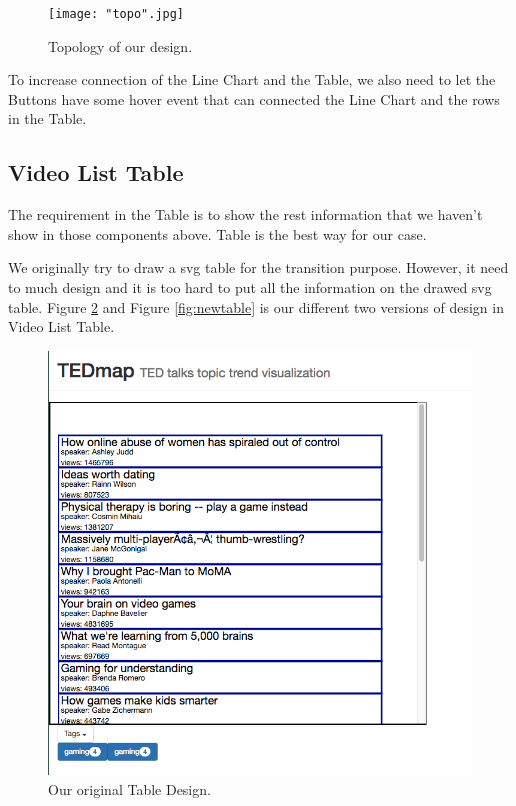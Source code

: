 \documentclass{report}
\numberwithin{figure}{section}
\begin{document}
\begin{figure}
\begin{center}
\texttt{[image: "topo".jpg]}
\caption{Topology of our design.}
\label{fig:topo}
\end{center}
\end{figure}


\quad To increase connection of the Line Chart and the Table, we also need to let the Buttons have some hover event that can connected the Line Chart and the rows in the Table.

\subsection{Video List Table}

\quad The requirement in the Table is to show the rest information that we haven't  show  in those components above. Table is the best way for our case. 

We originally try to draw a svg table for the transition purpose. However, it need to much design and it is too hard to put all the information on the drawed svg table. Figure \ref{fig:oldtable} and Figure \ref{fig:newtable} is our different two versions of design in Video List Table.

\begin{figure}
\begin{center}
\includegraphics[scale=0.2]{table}
\caption{Our original Table Design.}
\label{fig:oldtable}
\end{center}
\end{figure} 
\end{document}
